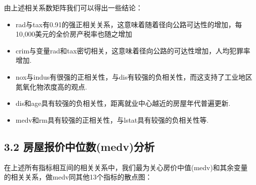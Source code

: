 \documentclass[UTF-8]{ctexart}
\begin{document}
由上述相关系数矩阵我们可以得出一些结论：

\begin{itemize}
	\item rad与tax有0.91的强正相关关系，这意味着随着径向公路可达性的增加，每10,000美元的全价房产税率也随之增加
	\item crim与变量rad和tax密切相关，这意味着径向公路的可达性增加，人均犯罪率增加.
	\item nox与indus有很强的正相关性，与dis有较强的负相关性，而这支持了工业地区氮氧化物浓度高的观点.
	\item dis和age具有较强的负相关性，距离就业中心越近的房屋年代普遍更新.
	\item medv和rm具有较强的正相关性，与lstat具有较强的负相关性等.
\end{itemize}

\subsection{3.2 房屋报价中位数(medv)分析}

在上述所有指标相互间的相关关系中，我们最为关心房价中值(medv)和其余变量的相关关系，做medv同其他13个指标的散点图：
\end{document}
